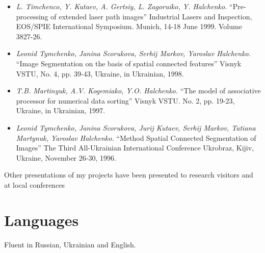 \documentclass[10pt,overlapped,line]{res}
\newcommand{\mtitle}[1]{``#1''}
\newcommand{\mauthors}[1]{ \textit{#1.}}
\newcommand{\mwhere}[1]{#1.}
\begin{document}
\begin{resume}
\begin{itemize}
   \item
     \mauthors{L. Timchenco, Y. Kutaev, A. Gertsiy, L. Zagoruiko, Y. Halchenko}
     \mtitle{Pre-processing of extended laser path images}
     \mwhere{Industrial Lasers and Inspection, EOS/SPIE International Symposium. Munich, 14-18 June 1999. Volume 3827-26}

   \item
     \mauthors{Leonid Tymchenko, Janina Scorukova, Serhij Markov, Yaroslav Halchenko}
     \mtitle{Image Segmentation on the basis of spatial connected features}
     \mwhere{Visnyk VSTU, No. 4, pp. 39-43, Ukraine, in Ukrainian, 1998}

   \item
     \mauthors{T.B. Martinyuk, A.V. Kogemiako, Y.O. Halchenko}
     \mtitle{The model of associative processor for numerical data sorting}
     \mwhere{ Visnyk VSTU. No. 2, pp. 19-23, Ukraine, in Ukrainian, 1997}

   \item
     \mauthors{Leonid Tymchenko, Janina Scorukova, Jurij Kutaev, Serhij Markov, Tatiana Martynuk, Yaroslav Halchenko}
     \mtitle{Method Spatial Connected Segmentation of Images}
     \mwhere{The Third All-Ukrainian International Conference Ukrobraz, Kijiv, Ukraine, November 26-30, 1996}
 \end{itemize}

 Other presentations of my projects have been presented to research visitors and at local conferences

 \section{Languages}
 Fluent in Russian, Ukrainian and English.

\pagebreak

\end{resume}
\end{document}
